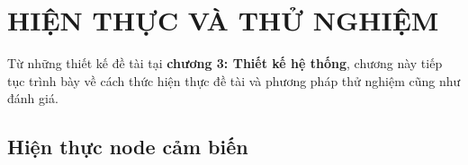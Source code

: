 \ifpdf
    \graphicspath{{Chapter4/Figs/Raster/}{Chapter4/Figs/Server/}{Chapter4/Figs/}}
\else
    \graphicspath{{Chapter4/Figs/Vector/}{Chapter4/Figs/}}
\fi
\chapter{HIỆN THỰC VÀ THỬ NGHIỆM}


Từ những thiết kế đề tài tại \textbf{chương 3: Thiết kế hệ thống}, chương này tiếp tục trình bày về cách thức hiện thực đề tài và phương pháp thử nghiệm cũng như đánh giá.
\section{Hiện thực node cảm biến}
